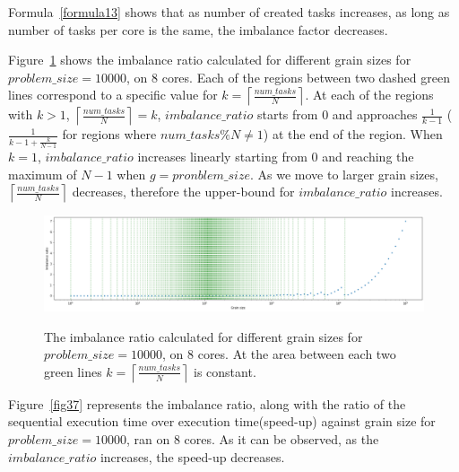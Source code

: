 Formula~\ref{formula13} shows that as number of created tasks increases, as long as number of tasks per core is the same, the imbalance factor decreases. 

\vspace{\baselineskip}

Figure~\ref{fig38} shows the imbalance ratio calculated for different grain sizes for $problem\_size=10000$, on 8 cores. Each of the regions between two dashed green lines correspond to a specific value for $k=\left\lceil{\frac{num\_{tasks}}{N}}\right \rceil$. 
At each of the regions with $k>1$, $\left\lceil{\frac{num\_{tasks}}{N}}\right \rceil=k$,  $imbalance\_{ratio}$ starts from $0$ and approaches $\frac{1}{k-1}$ ($\frac{1}{k-1+\frac{k}{N-1}}$ for regions where $num\_{tasks}\%{N}\neq{1}$) at the end of the region. When $k=1$, $imbalance\_{ratio}$ increases linearly starting from 0 and reaching the maximum of $N-1$ when $g=pronblem\_{size}$. As we move to larger grain sizes, $\left\lceil{\frac{num\_{tasks}}{N}}\right \rceil$ decreases, therefore the upper-bound for $imbalance\_{ratio}$ increases.   


\vspace{\baselineskip}	
\begin{figure}[H]
	\centering
	{\includegraphics[scale=.25]{images/hpx_for_loop/imbalance_ratio_100000_8.png}}
	\caption{The imbalance ratio calculated for different grain sizes for $problem\_size=10000$, on 8 cores. At the area between each two green lines $k=\left\lceil{\frac{num\_{tasks}}{N}}\right \rceil$ is constant.}\label{fig38}		
\end{figure}



Figure~\ref{fig37} represents the imbalance ratio, along with the ratio of the sequential execution time over execution time(speed-up) against grain size for $problem\_size=10000$, ran on 8 cores.   
As it can be observed, as the $imbalance\_{ratio}$ increases, the speed-up decreases. 

